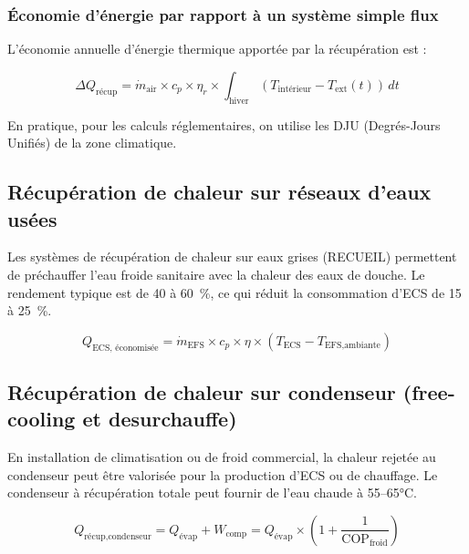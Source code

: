 \subsubsection{Économie d'énergie par rapport à un système simple flux}

L'économie annuelle d'énergie thermique apportée par la récupération est :

\begin{equation}
  \Delta Q_{\text{récup}} = \dot{m}_{\text{air}} \times c_p \times \eta_r \times \int_{\text{hiver}} \left(T_{\text{intérieur}} - T_{\text{ext}}(t)\right) \, dt
  \label{eq:recup_annuel}
\end{equation}

En pratique, pour les calculs réglementaires, on utilise les DJU (Degrés-Jours Unifiés) de la zone climatique.

\subsection{Récupération de chaleur sur réseaux d'eaux usées}

Les systèmes de récupération de chaleur sur eaux grises (RECUEIL) permettent de préchauffer l'eau froide sanitaire avec la chaleur des eaux de douche. Le rendement typique est de 40 à 60~\%, ce qui réduit la consommation d'ECS de 15 à 25~\%.

\begin{equation}
  Q_{\text{ECS, économisée}} = \dot{m}_{\text{EFS}} \times c_p \times \eta \times (T_{\text{ECS}} - T_{\text{EFS,ambiante}})
\end{equation}

\subsection{Récupération de chaleur sur condenseur (free-cooling et desurchauffe)}

En installation de climatisation ou de froid commercial, la chaleur rejetée au condenseur peut être valorisée pour la production d'ECS ou de chauffage. Le condenseur à récupération totale peut fournir de l'eau chaude à 55--65°C.

\begin{equation}
  Q_{\text{récup,condenseur}} = Q_{\text{évap}} + W_{\text{comp}} = Q_{\text{évap}} \times \left(1 + \frac{1}{\text{COP}_{\text{froid}}}\right)
\end{equation}

